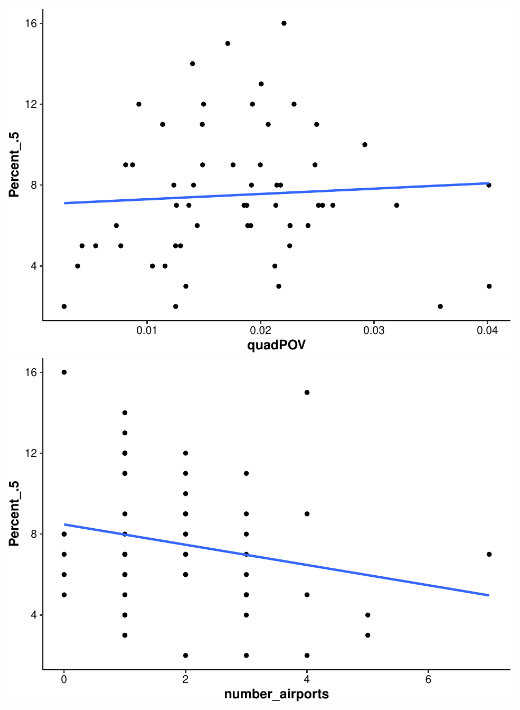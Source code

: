 \documentclass[
  12pt,
]{article}
\begin{document}
\includegraphics{Alcorn_Bao_Hermanson_ENV872_Project_files/figure-latex/linear plotssss -4.pdf}
\includegraphics{Alcorn_Bao_Hermanson_ENV872_Project_files/figure-latex/linear plotssss -5.pdf}
\end{document}
